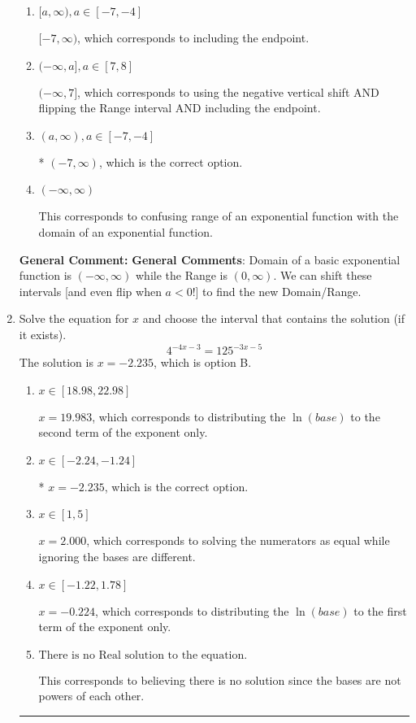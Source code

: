 \documentclass{extbook}[14pt]
\newcommand{\litem}[1]{\item #1

\rule{\textwidth}{0.4pt}}
\begin{document}
\begin{enumerate}
{\begin{enumerate}[label=\Alph*.]
$(-\infty, 7)$, which corresponds to using the negative vertical shift AND flipping the Range interval.
\item \( [a, \infty), a \in [-7, -4] \)

$[-7, \infty)$, which corresponds to including the endpoint.
\item \( (-\infty, a], a \in [7, 8] \)

$(-\infty, 7]$, which corresponds to using the negative vertical shift AND flipping the Range interval AND including the endpoint.
\item \( (a, \infty), a \in [-7, -4] \)

* $(-7, \infty)$, which is the correct option.
\item \( (-\infty, \infty) \)

This corresponds to confusing range of an exponential function with the domain of an exponential function.
\end{enumerate}

\textbf{General Comment:} \textbf{General Comments}: Domain of a basic exponential function is $(-\infty, \infty)$ while the Range is $(0, \infty)$. We can shift these intervals [and even flip when $a<0$!] to find the new Domain/Range.
}
\litem{
Solve the equation for $x$ and choose the interval that contains the solution (if it exists).
\[ 4^{-4x-3} = 125^{-3x-5} \]
The solution is \( x = -2.235 \), which is option B.\begin{enumerate}[label=\Alph*.]
\item \( x \in [18.98, 22.98] \)

$x = 19.983$, which corresponds to distributing the $\ln(base)$ to the second term of the exponent only.
\item \( x \in [-2.24, -1.24] \)

* $x = -2.235$, which is the correct option.
\item \( x \in [1, 5] \)

$x = 2.000$, which corresponds to solving the numerators as equal while ignoring the bases are different.
\item \( x \in [-1.22, 1.78] \)

$x = -0.224$, which corresponds to distributing the $\ln(base)$ to the first term of the exponent only.
\item \( \text{There is no Real solution to the equation.} \)

This corresponds to believing there is no solution since the bases are not powers of each other.
\end{enumerate}

}
\end{enumerate}
\end{document}
